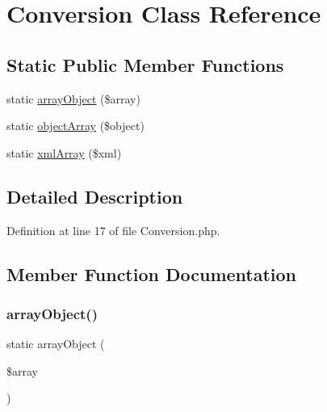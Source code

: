 \hypertarget{class_zest_1_1_data_1_1_conversion}{}\section{Conversion Class Reference}
\label{class_zest_1_1_data_1_1_conversion}
\subsection*{Static Public Member Functions}
\begin{DoxyCompactItemize}
\item 
static \mbox{\hyperlink{class_zest_1_1_data_1_1_conversion_a9a6580703dcdd625182780f19eae0f98}{array\+Object}} (\$array)
\item 
static \mbox{\hyperlink{class_zest_1_1_data_1_1_conversion_a21e1e27817766782daea50d438f6a310}{object\+Array}} (\$object)
\item 
static \mbox{\hyperlink{class_zest_1_1_data_1_1_conversion_aed89a7cce16c2f0dbf0552383cec7394}{xml\+Array}} (\$xml)
\end{DoxyCompactItemize}


\subsection{Detailed Description}


Definition at line 17 of file Conversion.\+php.



\subsection{Member Function Documentation}
\mbox{\label{class_zest_1_1_data_1_1_conversion_a9a6580703dcdd625182780f19eae0f98}} 
\subsubsection{\texorpdfstring{array\+Object()}{arrayObject()}}
{\footnotesize\ttfamily static array\+Object (\begin{DoxyParamCaption}\item[{}]{\$array }\end{DoxyParamCaption})\hspace{0.3cm}{\ttfamily [static]}}

